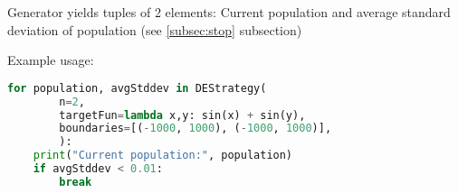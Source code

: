 \documentclass[11pt,a4paper]{article}
\begin{document}
Generator yields tuples of 2 elements:
Current population and average standard deviation of population (see \ref{subsec:stop} subsection)

Example usage:
\begin{lstlisting}[language=Python]
for population, avgStddev in DEStrategy(
        n=2,
        targetFun=lambda x,y: sin(x) + sin(y),
        boundaries=[(-1000, 1000), (-1000, 1000)],
        ):
    print("Current population:", population)
    if avgStddev < 0.01:
        break
\end{lstlisting}
\end{document}

